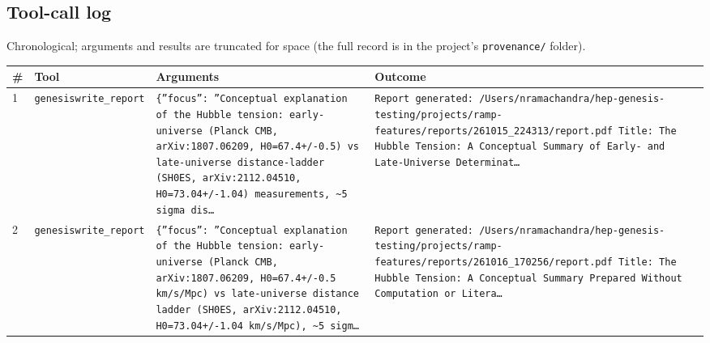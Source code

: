 \documentclass[11pt,a4paper]{article}
\begin{document}
\subsection{Tool-call log}
Chronological; arguments and results are truncated for space (the full record is in the project's \texttt{provenance/} folder).
\begin{longtable}{@{}p{}p{}p{}p{}@{}}
\toprule \# & Tool & Arguments & Outcome \\ \midrule \endhead
1 & \texttt{genesis}\newline\texttt{write\_\allowbreak{}report} & \texttt{\{''focus'':\allowbreak{} ''Conceptual explanation of the Hubble tension:\allowbreak{} early-universe (Planck CMB,\allowbreak{} arXiv:\allowbreak{}1807.06209,\allowbreak{} H0=\allowbreak{}67.4+/\allowbreak{}-0.5)\allowbreak{} vs late-universe distance-ladder (SH0ES,\allowbreak{} arXiv:\allowbreak{}2112.04510,\allowbreak{} H0=\allowbreak{}73.04+/\allowbreak{}-1.04)\allowbreak{} measurements,\allowbreak{} \textasciitilde{}\allowbreak{}5 sigma dis\ldots{}\allowbreak{}} & \texttt{Report generated:\allowbreak{} /\allowbreak{}Users/\allowbreak{}nramachandra/\allowbreak{}hep-genesis-testing/\allowbreak{}projects/\allowbreak{}ramp-features/\allowbreak{}reports/\allowbreak{}261015\_\allowbreak{}224313/\allowbreak{}report.pdf Title:\allowbreak{} The Hubble Tension:\allowbreak{} A Conceptual Summary of Early- and Late-Universe Determinat\ldots{}\allowbreak{}} \\
2 & \texttt{genesis}\newline\texttt{write\_\allowbreak{}report} & \texttt{\{''focus'':\allowbreak{} ''Conceptual explanation of the Hubble tension:\allowbreak{} early-universe (Planck CMB,\allowbreak{} arXiv:\allowbreak{}1807.06209,\allowbreak{} H0=\allowbreak{}67.4+/\allowbreak{}-0.5 km/\allowbreak{}s/\allowbreak{}Mpc)\allowbreak{} vs late-universe distance ladder (SH0ES,\allowbreak{} arXiv:\allowbreak{}2112.04510,\allowbreak{} H0=\allowbreak{}73.04+/\allowbreak{}-1.04 km/\allowbreak{}s/\allowbreak{}Mpc)\allowbreak{},\allowbreak{} \textasciitilde{}\allowbreak{}5 sigm\ldots{}\allowbreak{}} & \texttt{Report generated:\allowbreak{} /\allowbreak{}Users/\allowbreak{}nramachandra/\allowbreak{}hep-genesis-testing/\allowbreak{}projects/\allowbreak{}ramp-features/\allowbreak{}reports/\allowbreak{}261016\_\allowbreak{}170256/\allowbreak{}report.pdf Title:\allowbreak{} The Hubble Tension:\allowbreak{} A Conceptual Summary Prepared Without Computation or Litera\ldots{}\allowbreak{}} \\

\end{longtable}
\end{document}
